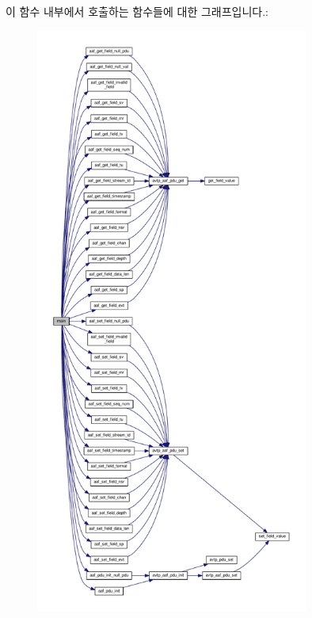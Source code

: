 이 함수 내부에서 호출하는 함수들에 대한 그래프입니다.\+:
\nopagebreak
\begin{figure}[H]
\begin{center}
\leavevmode
\includegraphics[height=550pt]{test-aaf_8c_a840291bc02cba5474a4cb46a9b9566fe_cgraph}
\end{center}
\end{figure}


